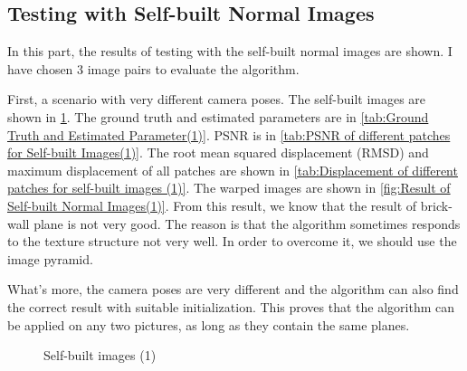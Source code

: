 \subsection{Testing with Self-built Normal Images}\label{subsec:Testing with Self-built Normal Images}
In this part, the results of testing with the self-built normal images are shown. I have chosen 3 image pairs to evaluate the algorithm.

First, a scenario with very different camera poses. The self-built images are shown in \cref{fig:Self-built Images(1)}. The ground truth and estimated parameters are in \cref{tab:Ground Truth and Estimated Parameter(1)}. PSNR is in \cref{tab:PSNR of different patches for Self-built Images(1)}. The root mean squared displacement (RMSD) and maximum displacement of all patches are shown in \cref{tab:Displacement of different patches for self-built images (1)}. The warped images are shown in \cref{fig:Result of Self-built Normal Images(1)}. From this result, we know that the result of brick-wall plane is not very good. The reason is that the algorithm sometimes responds to the texture structure not very well. In order to overcome it, we should use the image pyramid. 

What's more, the camera poses are very different and the algorithm can also find the correct result with suitable initialization. This proves that the algorithm can be applied on any two pictures, as long as they contain the same planes.
\begin{figure}[htbp]
	\centering
	 \quad
	\caption{Self-built images (1)}
	\label{fig:Self-built Images(1)}
\end{figure}

